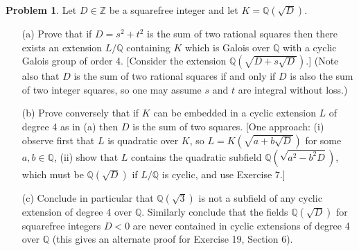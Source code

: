 \documentclass{article}
\theoremstyle{definition}
\newtheorem{prob}{Problem}
\newcommand{\QQ}{\mathbb Q}
\newcommand{\ZZ}{\mathbb Z}
\begin{document}
\setcounter{prob}{18}
\begin{prob}
	Let $D \in \ZZ$ be a squarefree integer and let $K = \QQ(\sqrt{D})$.
	\begin{enumerate}
		\item[(a)] Prove that if $D = s^2 + t^2$ is the sum of two rational squares then there exists an extension $L/\QQ$ containing $K$ which is Galois over $\QQ$ with a cyclic Galois group of order 4.
			[Consider the extension $\QQ(\sqrt{D + s \sqrt{D}})$.]
			(Note also that $D$ is the sum of two rational squares if and only if $D$ is also the sum of two integer squares, so one may assume $s$ and $t$ are integral without loss.)

		\item[(b)] Prove conversely that if $K$ can be embedded in a cyclic extension $L$ of degree 4 as in (a) then $D$ is the sum of two squares.
			[One approach: (i) observe first that $L$ is quadratic over $K$, so $L = K(\sqrt{a + b \sqrt{D}})$ for some $a, b \in \QQ$,
			(ii) show that $L$ contains the quadratic subfield $\QQ(\sqrt{a^2 - b^2 D})$, which must be $\QQ(\sqrt{D})$ if $L/\QQ$ is cyclic, and use Exercise 7.] 

		\item[(c)] Conclude in particular that $\QQ(\sqrt{3})$ is not a subfield of any cyclic extension of degree 4 over $\QQ$.
			Similarly conclude that the fields $\QQ(\sqrt{D})$ for squarefree integers $D < 0$ are never contained in cyclic extensions of degree 4 over $\QQ$ (this gives an alternate proof for Exercise 19, Section 6).
	\end{enumerate}
\end{prob}
\end{document}
